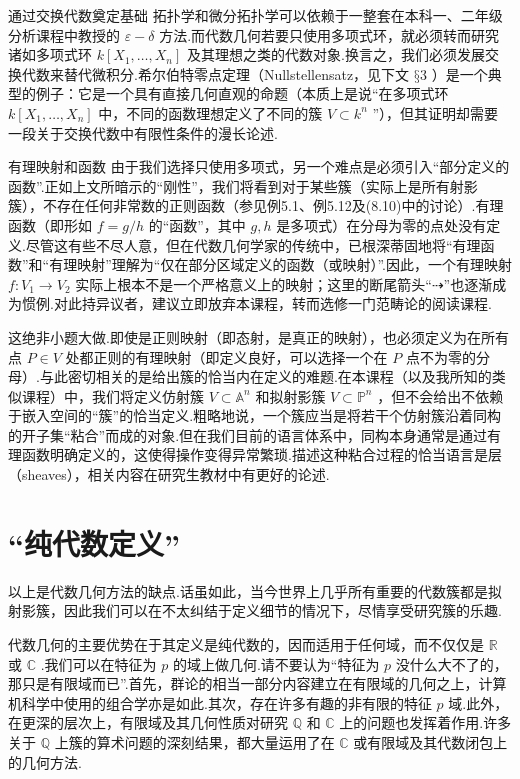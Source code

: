 通过交换代数奠定基础 拓扑学和微分拓扑学可以依赖于一整套在本科一、二年级分析课程中教授的 \(\varepsilon  - \delta\) 方法.而代数几何若要只使用多项式环，就必须转而研究诸如多项式环 \(k\left\lbrack  {{X}_{1},\ldots ,{X}_{n}}\right\rbrack\) 及其理想之类的代数对象.换言之，我们必须发展交换代数来替代微积分.希尔伯特零点定理（Nullstellensatz，见下文 \(§3\) ）是一个典型的例子：它是一个具有直接几何直观的命题（本质上是说“在多项式环 \(k\left\lbrack  {{X}_{1},\ldots ,{X}_{n}}\right\rbrack\) 中，不同的函数理想定义了不同的簇 \(V \subset  {k}^{n}\) ”），但其证明却需要一段关于交换代数中有限性条件的漫长论述.

有理映射和函数 由于我们选择只使用多项式，另一个难点是必须引入“部分定义的函数”.正如上文所暗示的“刚性”，我们将看到对于某些簇（实际上是所有射影簇），不存在任何非常数的正则函数（参见例5.1、例5.12及(8.10)中的讨论）.有理函数（即形如 \(f = g/h\) 的“函数”，其中 \(g,h\) 是多项式）在分母为零的点处没有定义.尽管这有些不尽人意，但在代数几何学家的传统中，已根深蒂固地将“有理函数”和“有理映射”理解为“仅在部分区域定义的函数（或映射）”.因此，一个有理映射 \(f : {V}_{1} \rightarrow  {V}_{2}\) 实际上根本不是一个严格意义上的映射；这里的断尾箭头“\(\dashrightarrow\)”也逐渐成为惯例.对此持异议者，建议立即放弃本课程，转而选修一门范畴论的阅读课程.

这绝非小题大做.即使是正则映射（即态射，是真正的映射），也必须定义为在所有点 \(P \in  V\) 处都正则的有理映射（即定义良好，可以选择一个在 \(P\) 点不为零的分母）.与此密切相关的是给出簇的恰当内在定义的难题.在本课程（以及我所知的类似课程）中，我们将定义仿射簇 \(V \subset  {\mathbb{A}}^{n}\) 和拟射影簇 \(V \subset  {\mathbb{P}}^{n}\) ，但不会给出不依赖于嵌入空间的“簇”的恰当定义.粗略地说，一个簇应当是将若干个仿射簇沿着同构的开子集“粘合”而成的对象.但在我们目前的语言体系中，同构本身通常是通过有理函数明确定义的，这使得操作变得异常繁琐.描述这种粘合过程的恰当语言是层（sheaves），相关内容在研究生教材中有更好的论述.

\section{“纯代数定义”}

以上是代数几何方法的缺点.话虽如此，当今世界上几乎所有重要的代数簇都是拟射影簇，因此我们可以在不太纠结于定义细节的情况下，尽情享受研究簇的乐趣.

代数几何的主要优势在于其定义是纯代数的，因而适用于任何域，而不仅仅是 \(\mathbb{R}\) 或 \(\mathbb{C}\) .我们可以在特征为 \(p\) 的域上做几何.请不要认为“特征为 \(p\) 没什么大不了的，那只是有限域而已”.首先，群论的相当一部分内容建立在有限域的几何之上，计算机科学中使用的组合学亦是如此.其次，存在许多有趣的非有限的特征 \(p\) 域.此外，在更深的层次上，有限域及其几何性质对研究 \(\mathbb{Q}\) 和 \(\mathbb{C}\) 上的问题也发挥着作用.许多关于 \(\mathbb{Q}\) 上簇的算术问题的深刻结果，都大量运用了在 \(\mathbb{C}\) 或有限域及其代数闭包上的几何方法.

